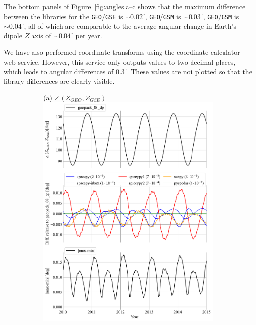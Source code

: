 \documentclass[draft]{agujournal2019}
\begin{document}
The bottom panels of Figure~\ref{fig:angles}a--c shows that the maximum difference between the libraries for the \texttt{GEO}/\texttt{GSE} is ${\sim}0.02^\circ$,  \texttt{GEO}/\texttt{GSM} is ${\sim} 0.03^\circ$, \texttt{GEO}/\texttt{GSM} is ${\sim}0.04^\circ$, all of which are comparable to the average angular change in Earth's dipole $Z$ axis of ${\sim}0.04^\circ$ per year.


We have also performed coordinate transforms using the  coordinate calculator web service. However, this service only outputs values to two decimal places, which leads to angular differences of $0.3^\circ$. These values are not plotted so that the library differences are clearly visible.

\begin{figure}[htb]
     \begin{subfigure}[b]{0.49\textwidth}
         (a) $\angle (Z_{GEO}, Z_{GSE})$
         \centering
         \includegraphics[width=\textwidth]{code/figures/angles/delta=1days_20100101-20150101/GEO_GSE.pdf}

\end{subfigure}
\end{figure}
\end{document}
